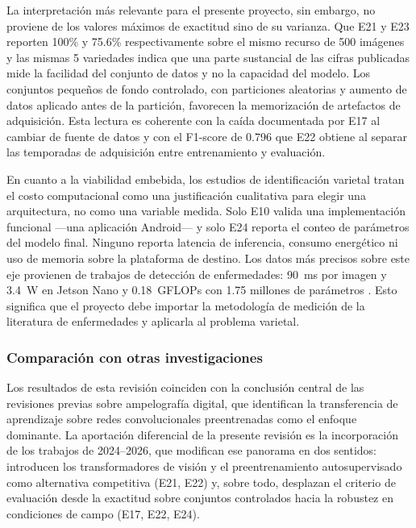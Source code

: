 La interpretación más relevante para el presente proyecto, sin embargo, no
proviene de los valores máximos de exactitud sino de su varianza. Que E21 y
E23 reporten 100\% y 75.6\% respectivamente sobre el mismo recurso de 500
imágenes y las mismas 5 variedades indica que una parte sustancial de las
cifras publicadas mide la facilidad del conjunto de datos y no la capacidad
del modelo. Los conjuntos pequeños de fondo controlado, con particiones
aleatorias y aumento de datos aplicado antes de la partición, favorecen la
memorización de artefactos de adquisición. Esta lectura es coherente con la
caída documentada por E17 al cambiar de fuente de datos y con el F1-score de
0.796 que E22 obtiene al separar las temporadas de adquisición entre
entrenamiento y evaluación.

En cuanto a la viabilidad embebida, los estudios de identificación varietal
tratan el costo computacional como una justificación cualitativa para elegir
una arquitectura, no como una variable medida. Solo E10 valida una
implementación funcional —una aplicación Android— y solo E24 reporta el
conteo de parámetros del modelo final. Ninguno reporta latencia de
inferencia, consumo energético ni uso de memoria sobre la plataforma de
destino. Los datos más precisos sobre este eje provienen de trabajos de
detección de enfermedades: 90~ms por imagen y 3.4~W en Jetson Nano
\citep{karim2024} y 0.18~GFLOPs con 1.75 millones de parámetros
\citep{chen2025}. Esto significa que el proyecto debe importar la metodología
de medición de la literatura de enfermedades y aplicarla al problema
varietal.

\subsubsection{Comparación con otras investigaciones}

Los resultados de esta revisión coinciden con la conclusión central de las
revisiones previas sobre ampelografía digital, que identifican la
transferencia de aprendizaje sobre redes convolucionales preentrenadas como
el enfoque dominante. La aportación diferencial de la presente revisión es la
incorporación de los trabajos de 2024--2026, que modifican ese panorama en
dos sentidos: introducen los transformadores de visión y el preentrenamiento
autosupervisado como alternativa competitiva (E21, E22) y, sobre todo,
desplazan el criterio de evaluación desde la exactitud sobre conjuntos
controlados hacia la robustez en condiciones de campo (E17, E22, E24).

